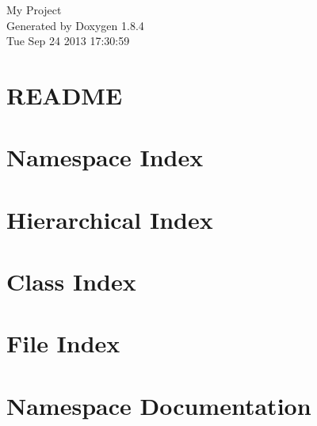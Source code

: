 \documentclass[twoside]{book}
\newcommand{\clearemptydoublepage}{%
  \newpage{\pagestyle{empty}\cleardoublepage}%
}
\begin{document}
\hypersetup{pageanchor=false}
\begin{titlepage}
\vspace*{7cm}
\begin{center}%
{\Large My Project }\\
\vspace*{1cm}
{\large Generated by Doxygen 1.8.4}\\
\vspace*{0.5cm}
{\small Tue Sep 24 2013 17:30:59}\\
\end{center}
\end{titlepage}
\clearemptydoublepage
\tableofcontents
\clearemptydoublepage
{}
\hypersetup{pageanchor=true}

\chapter{R\-E\-A\-D\-M\-E}
\label{md_README}
\hypertarget{md_README}{}

\chapter{Namespace Index}

\chapter{Hierarchical Index}

\chapter{Class Index}

\chapter{File Index}

\chapter{Namespace Documentation}



\end{document}
